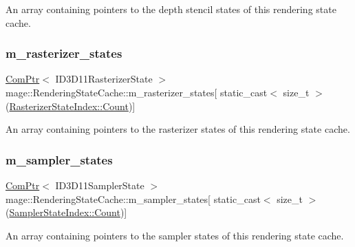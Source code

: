An array containing pointers to the depth stencil states of this rendering state cache. \hypertarget{structmage_1_1_rendering_state_cache_a858648eef1ec717f0f2b2f98a8703964}{}\label{structmage_1_1_rendering_state_cache_a858648eef1ec717f0f2b2f98a8703964} 
\subsubsection{\texorpdfstring{m\+\_\+rasterizer\+\_\+states}{m\_rasterizer\_states}}
{\footnotesize\ttfamily \hyperlink{namespacemage_ae74f374780900893caa5555d1031fd79}{Com\+Ptr}$<$ I\+D3\+D11\+Rasterizer\+State $>$ mage\+::\+Rendering\+State\+Cache\+::m\+\_\+rasterizer\+\_\+states\mbox{[} static\+\_\+cast$<$ size\+\_\+t $>$(\hyperlink{structmage_1_1_rendering_state_cache_ab3cd83fde15cb9f0858e9617e32cd044ae93f994f01c537c4e2f7d8528c3eb5e9}{Rasterizer\+State\+Index\+::\+Count})\mbox{]}\hspace{0.3cm}{\ttfamily [private]}}

An array containing pointers to the rasterizer states of this rendering state cache. \hypertarget{structmage_1_1_rendering_state_cache_a7118f82f0ed5ac110588811558695390}{}\label{structmage_1_1_rendering_state_cache_a7118f82f0ed5ac110588811558695390} 
\subsubsection{\texorpdfstring{m\+\_\+sampler\+\_\+states}{m\_sampler\_states}}
{\footnotesize\ttfamily \hyperlink{namespacemage_ae74f374780900893caa5555d1031fd79}{Com\+Ptr}$<$ I\+D3\+D11\+Sampler\+State $>$ mage\+::\+Rendering\+State\+Cache\+::m\+\_\+sampler\+\_\+states\mbox{[} static\+\_\+cast$<$ size\+\_\+t $>$(\hyperlink{structmage_1_1_rendering_state_cache_a4e1d4796699929e0618ff54621910770ae93f994f01c537c4e2f7d8528c3eb5e9}{Sampler\+State\+Index\+::\+Count})\mbox{]}\hspace{0.3cm}{\ttfamily [private]}}

An array containing pointers to the sampler states of this rendering state cache. 